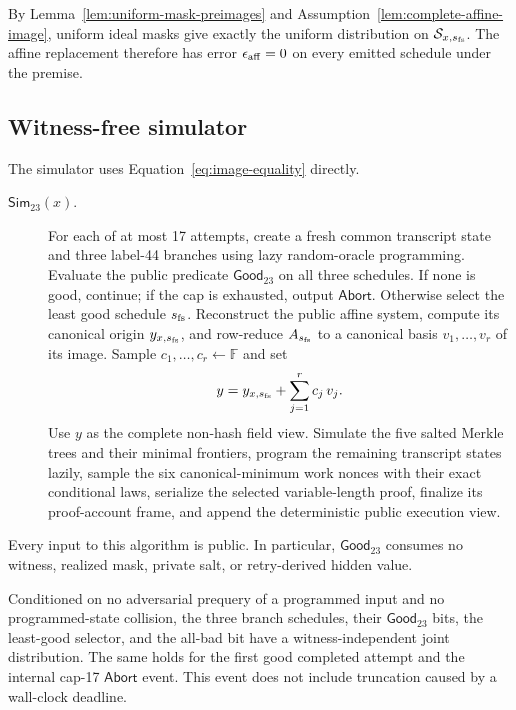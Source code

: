 By Lemma~\ref{lem:uniform-mask-preimages} and
Assumption~\ref{lem:complete-affine-image}, uniform ideal masks give exactly the
uniform distribution on \(\mathcal S_{x,s_{\rm fs}}\).  The affine replacement
therefore has error \(\epsilon_{\rm aff}=0\) on every emitted schedule under
the premise.

\subsection{Witness-free simulator}

The simulator uses Equation~\eqref{eq:image-equality} directly.

\begin{description}
\item[\(\mathsf{Sim}_{23}(x)\).]
For each of at most 17 attempts, create a fresh common transcript state and
three label-44 branches using lazy random-oracle programming.  Evaluate the
public predicate \(\mathsf{Good}_{23}\) on all three schedules.  If none is
good, continue; if the cap is exhausted, output \(\mathsf{Abort}\).  Otherwise
select the least good schedule \(s_{\rm fs}\).  Reconstruct the public affine
system, compute its canonical origin \(y_{x,s_{\rm fs}}\), and row-reduce
\(A_{s_{\rm fs}}\) to a canonical basis
\(v_1,\ldots,v_r\) of its image.  Sample
\(c_1,\ldots,c_r\leftarrow\mathbb F\) and set
\[
 y=y_{x,s_{\rm fs}}+\sum_{j=1}^r c_j\,v_j.
\]
Use \(y\) as the complete non-hash field view.  Simulate the five salted
Merkle trees and their minimal frontiers, program the remaining transcript
states lazily, sample the six canonical-minimum work nonces with their exact
conditional laws, serialize the selected variable-length proof, finalize its
proof-account frame, and append the deterministic public execution view.
\end{description}

Every input to this algorithm is public.  In particular,
\(\mathsf{Good}_{23}\) consumes no witness, realized mask, private salt, or
retry-derived hidden value.

\begin{lemma}
\label{lem:selection-hiding-abort}
Conditioned on no adversarial prequery of a programmed input and no
programmed-state collision, the three branch schedules, their
\(\mathsf{Good}_{23}\) bits,
the least-good selector, and the all-bad bit have a witness-independent joint
distribution.  The same holds for the first good completed attempt and the
internal cap-17 \(\mathsf{Abort}\) event.  This event does not include
truncation caused by a wall-clock deadline.
\end{lemma}


